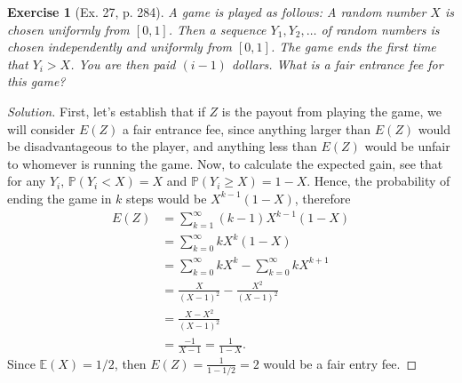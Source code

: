 \documentclass[letterpaper, 10 pt, conference]{article}
\newtheorem{ex}{Exercise}
\newcommand\E{\ensuremath{\mathbb{E}}}
\renewcommand{\P}{\ensuremath{\mathbb{P}}}
\begin{document}
\begin{ex}[Ex. 27, p. 284]
A game is played as follows: A random number $X$ is chosen uniformly from $[0,1]$. Then a sequence $Y_1, Y_2, \dots$ of random numbers is chosen independently and uniformly from $[0,1]$. The game ends the first time that $Y_i > X$. You are then paid $(i-1)$ dollars. What is a fair entrance fee for this game?
\end{ex}
\begin{proof}[Solution]
First, let's establish that if $Z$ is the payout from playing the game, we will consider $E(Z)$ a fair entrance fee, since anything larger than $E(Z)$ would be disadvantageous to the player, and anything less than $E(Z)$ would be unfair to whomever is running the game. Now, to calculate the expected gain, see that for any $Y_i, \, \P(Y_i < X) = X$ and $\P(Y_i \geq X) =  1-X$. Hence, the probability of ending the game in $k$ steps would be $X^{k-1} (1-X)$, therefore
\begin{align}
	E(Z) &= \sum_{k = 1}^{\infty} (k-1) X^{k-1}(1-X)\\
	&= \sum_{k = 0}^{\infty} k X^k(1-X) \\
	&=  \sum_{k = 0}^{\infty} k X^k -  \sum_{k = 0}^{\infty} k X^{k+1}\\
	&= \frac{X}{(X-1)^2} - \frac{X^2}{(X-1)^2}\\
	&= \frac{X - X^2}{(X-1)^2}\\
	&= \frac{-1}{X-1} = \frac{1}{1-X}.
\end{align}
Since $\E(X) = 1/2$, then $E(Z) = \frac{1}{1-1/2} = 2$ would be a fair entry fee.
\end{proof}



\end{document}
